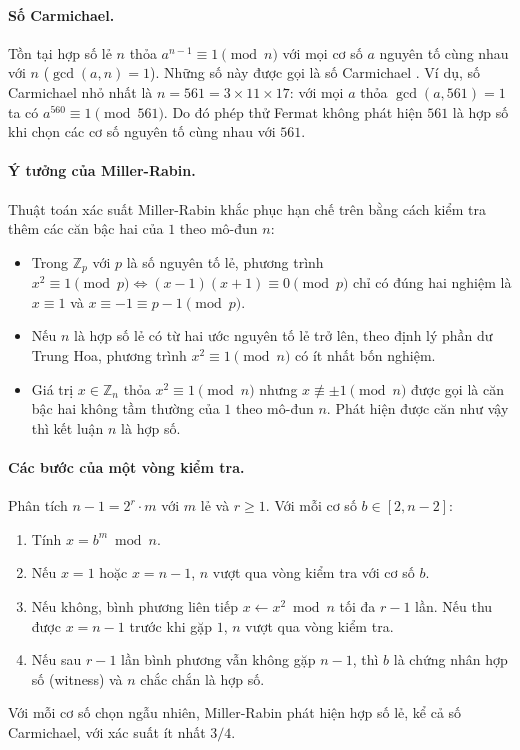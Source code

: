 \paragraph{Số Carmichael.} Tồn tại hợp số lẻ $n$ thỏa $a^{n-1} \equiv 1 \pmod n$ với mọi cơ số $a$ nguyên tố cùng nhau với $n$ ($\gcd(a, n) = 1$). Những số này được gọi là số Carmichael \cite{menezes1996handbook}. Ví dụ, số Carmichael nhỏ nhất là $n = 561 = 3 \times 11 \times 17$: với mọi $a$ thỏa $\gcd(a, 561) = 1$ ta có $a^{560} \equiv 1 \pmod{561}$. Do đó phép thử Fermat không phát hiện $561$ là hợp số khi chọn các cơ số nguyên tố cùng nhau với $561$.

\paragraph{Ý tưởng của Miller-Rabin.} Thuật toán xác suất Miller-Rabin \cite{rabin1980} khắc phục hạn chế trên bằng cách kiểm tra thêm các căn bậc hai của $1$ theo mô-đun $n$:
\begin{itemize}
    \item Trong $\mathbb{Z}_p$ với $p$ là số nguyên tố lẻ, phương trình $x^2 \equiv 1 \pmod p \iff (x - 1)(x + 1) \equiv 0 \pmod p$ chỉ có đúng hai nghiệm là $x \equiv 1$ và $x \equiv -1 \equiv p - 1 \pmod p$.
    \item Nếu $n$ là hợp số lẻ có từ hai ước nguyên tố lẻ trở lên, theo định lý phần dư Trung Hoa, phương trình $x^2 \equiv 1 \pmod n$ có ít nhất bốn nghiệm.
    \item Giá trị $x \in \mathbb{Z}_n$ thỏa $x^2 \equiv 1 \pmod n$ nhưng $x \not\equiv \pm 1 \pmod n$ được gọi là căn bậc hai không tầm thường của $1$ theo mô-đun $n$. Phát hiện được căn như vậy thì kết luận $n$ là hợp số.
\end{itemize}

\paragraph{Các bước của một vòng kiểm tra.} Phân tích $n - 1 = 2^r \cdot m$ với $m$ lẻ và $r \ge 1$. Với mỗi cơ số $b \in [2, n - 2]$:
\begin{enumerate}
    \item Tính $x = b^m \bmod n$.
    \item Nếu $x = 1$ hoặc $x = n - 1$, $n$ vượt qua vòng kiểm tra với cơ số $b$.
    \item Nếu không, bình phương liên tiếp $x \leftarrow x^2 \bmod n$ tối đa $r - 1$ lần. Nếu thu được $x = n - 1$ trước khi gặp $1$, $n$ vượt qua vòng kiểm tra.
    \item Nếu sau $r - 1$ lần bình phương vẫn không gặp $n - 1$, thì $b$ là chứng nhân hợp số (witness) và $n$ chắc chắn là hợp số.
\end{enumerate}
Với mỗi cơ số chọn ngẫu nhiên, Miller-Rabin phát hiện hợp số lẻ, kể cả số Carmichael, với xác suất ít nhất $3/4$.

